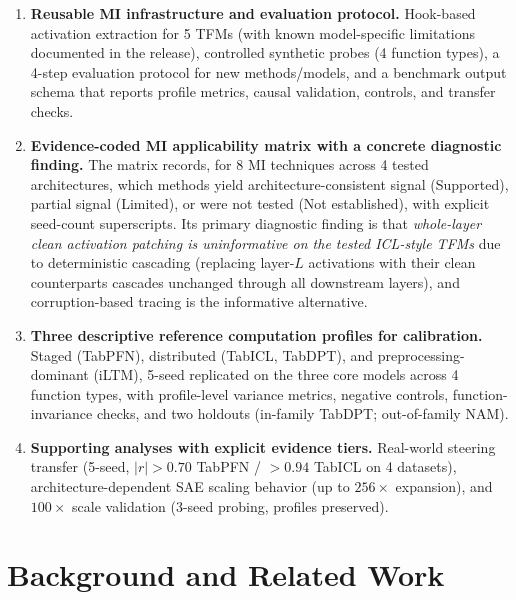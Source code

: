 \documentclass{article}
\begin{document}
\begin{enumerate}
\item \textbf{Reusable MI infrastructure and evaluation protocol.} Hook-based activation extraction for 5 TFMs (with known model-specific limitations documented in the release), controlled synthetic probes (4 function types), a 4-step evaluation protocol for new methods/models, and a benchmark output schema that reports profile metrics, causal validation, controls, and transfer checks.
  \item \textbf{Evidence-coded MI applicability matrix with a concrete diagnostic finding.} The matrix records, for 8 MI techniques across 4 tested architectures, which methods yield architecture-consistent signal (Supported), partial signal (Limited), or were not tested (Not established), with explicit seed-count superscripts. Its primary diagnostic finding is that \emph{whole-layer clean activation patching is uninformative on the tested ICL-style TFMs} due to deterministic cascading (replacing layer-$L$ activations with their clean counterparts cascades unchanged through all downstream layers), and corruption-based tracing is the informative alternative.
  \item \textbf{Three descriptive reference computation profiles for calibration.} Staged (TabPFN), distributed (TabICL, TabDPT), and preprocessing-dominant (iLTM), 5-seed replicated on the three core models across 4 function types, with profile-level variance metrics, negative controls, function-invariance checks, and two holdouts (in-family TabDPT; out-of-family NAM).
  \item \textbf{Supporting analyses with explicit evidence tiers.} Real-world steering transfer (5-seed, $|r| > 0.70$ TabPFN / $> 0.94$ TabICL on 4 datasets), architecture-dependent SAE scaling behavior (up to $256\times$ expansion), and $100\times$ scale validation (3-seed probing, profiles preserved).
\end{enumerate}

\section{Background and Related Work}
\end{document}
